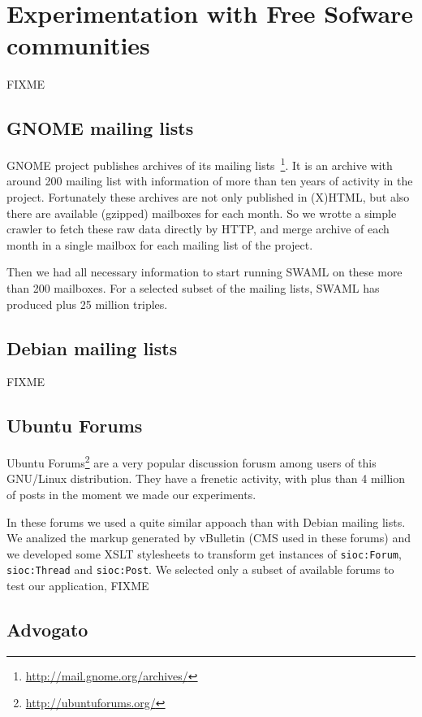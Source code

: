 \documentclass{../templates/www2008-submission}
\begin{document}
\section{Experimentation with Free Sofware communities}

FIXME

\subsection{\label{sec:gnome}GNOME mailing lists}

GNOME project publishes archives of its mailing lists~\footnote{\url{http://mail.gnome.org/archives/}}.
It is an archive with around 200 mailing list with information of 
more than ten years of activity in the project. Fortunately these
archives are not only published in (X)HTML, but also there are 
available (gzipped) mailboxes for each month. So we wrotte a simple
crawler to fetch these raw data directly by HTTP, and merge archive
of each month in a single mailbox for each mailing list of the project.

Then we had all necessary information to start running SWAML on these 
more than 200 mailboxes. For a selected subset of the mailing lists, 
SWAML has produced plus 25 million triples.

\subsection{Debian mailing lists}

FIXME

\subsection{Ubuntu Forums}

Ubuntu Forums\footnote{\url{http://ubuntuforums.org/}} are a very popular 
discussion forusm among users of this GNU/Linux distribution. They have a 
frenetic activity, with plus than 4 million of posts in the moment we made
our experiments.

In these forums we used a quite similar appoach than with Debian mailing
lists. We analized the markup generated by vBulletin (CMS used in these forums)
and we developed some XSLT stylesheets to transform get instances of
\texttt{sioc:Forum}, \texttt{sioc:Thread} and \texttt{sioc:Post}. We 
selected only a subset of available forums to test our application, FIXME

\subsection{Advogato}
\end{document}
